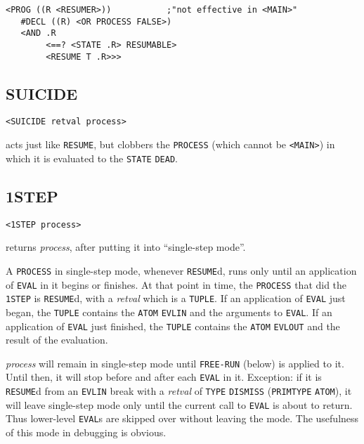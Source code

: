 \documentclass[a4paper]{scrbook}
\begin{document}
\begin{verbatim}
<PROG ((R <RESUMER>))           ;"not effective in <MAIN>"
   #DECL ((R) <OR PROCESS FALSE>)
   <AND .R
        <==? <STATE .R> RESUMABLE>
        <RESUME T .R>>>
\end{verbatim}

\subsection{SUICIDE}\label{suicide}

\begin{verbatim}
<SUICIDE retval process>
\end{verbatim}

 acts just like \texttt{RESUME}, but clobbers the \texttt{PROCESS} (which cannot be
\texttt{\textless{}MAIN\textgreater{}}) in which it is evaluated to the \texttt{STATE} \texttt{DEAD}.

\subsection{1STEP}\label{step}

\begin{verbatim}
<1STEP process>
\end{verbatim}

 returns \emph{process}, after putting it into ``single-step mode''.

A \texttt{PROCESS} in single-step mode, whenever \texttt{RESUME}d, runs only until an application of
\texttt{EVAL} in it begins or finishes. At that point in time, the \texttt{PROCESS} that did the
\texttt{1STEP} is \texttt{RESUME}d, with a \emph{retval} which is a \texttt{TUPLE}. If an application of \texttt{EVAL} just
began, the \texttt{TUPLE} contains the \texttt{ATOM} \texttt{EVLIN} and the arguments to
\texttt{EVAL}. If an application of \texttt{EVAL} just finished, the \texttt{TUPLE} contains the \texttt{ATOM}
\texttt{EVLOUT} and the result of the evaluation.

\emph{process} will remain in single-step mode until \texttt{FREE-RUN} (below) is applied to it. Until then, it will stop
before and after each \texttt{EVAL} in it. Exception: if it is \texttt{RESUME}d from an \texttt{EVLIN} break with a
\emph{retval} of \texttt{TYPE} \texttt{DISMISS} (\texttt{PRIMTYPE} \texttt{ATOM}), it will
leave single-step mode only until the current call to \texttt{EVAL} is about to return. Thus lower-level \texttt{EVAL}s are
skipped over without leaving the mode. The usefulness of this mode in debugging is obvious.
\end{document}
